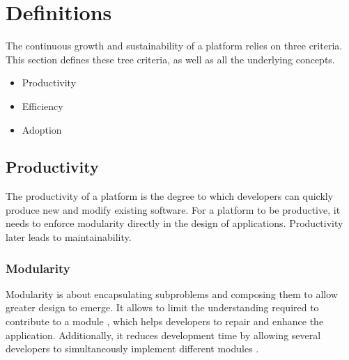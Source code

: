 \section{Definitions} \label{chapter3:definitions}

The continuous growth and sustainability of a platform relies on three criteria.
This section defines these tree criteria, as well as all the underlying concepts.


\begin{itemize}
\item Productivity
\item Efficiency
\item Adoption
\end{itemize}

\subsection{Productivity}

The productivity of a platform is the degree to which developers can quickly produce new and modify existing software.
For a platform to be productive, it needs to enforce modularity directly in the design of applications.
Productivity later leads to maintainability.

\subsubsection{Modularity}

Modularity is about encapsulating subproblems and composing them to allow greater design to emerge.
It allows to limit the understanding required to contribute to a module \cite{Stevens1974}, which helps developers to repair and enhance the application. 
Additionally, it reduces development time by allowing several developers to simultaneously implement different modules \cite{Wong2009,Cataldo2006}.


